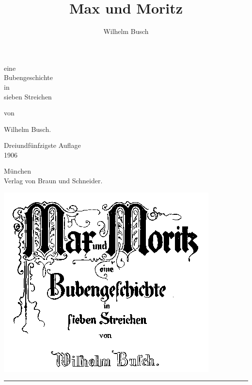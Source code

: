 \documentclass[a4paper,12pt]{article}
\begin{document}
\title{Max und Moritz}
\author{Wilhelm Busch}
\maketitle


\begin{center}
eine\\
Bubengeschichte\\
in\\
sieben Streichen  
\end{center}

\begin{center}
von
\end{center}

\begin{center}
Wilhelm Busch.  
\end{center}


\begin{center}
Dreiundfünfzigste Auflage\\
1906 
\end{center}



\begin{center}
München\\
Verlag von Braun und Schneider.
\end{center}




\begin{center}\includegraphics[scale=.7, alt={Titelblatt}]{images/titel.png}\end{center}


\bigskip
\hrule
\end{document}
